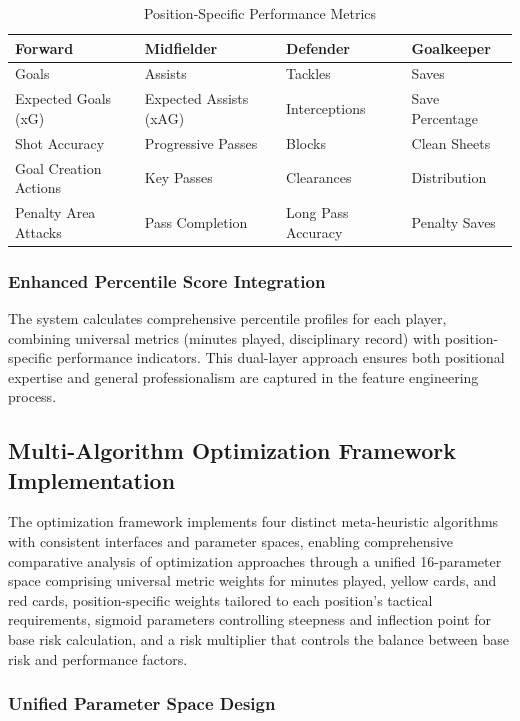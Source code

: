 \begin{table}[h]
\centering
\caption{Position-Specific Performance Metrics}
\label{tab:position_metrics}
\begin{tabular}{llll}
\toprule
\textbf{Forward} & \textbf{Midfielder} & \textbf{Defender} & \textbf{Goalkeeper} \\
\midrule
Goals & Assists & Tackles & Saves \\
Expected Goals (xG) & Expected Assists (xAG) & Interceptions & Save Percentage \\
Shot Accuracy & Progressive Passes & Blocks & Clean Sheets \\
Goal Creation Actions & Key Passes & Clearances & Distribution \\
Penalty Area Attacks & Pass Completion & Long Pass Accuracy & Penalty Saves \\
\bottomrule
\end{tabular}
\end{table}

\subsubsection{Enhanced Percentile Score Integration}

The system calculates comprehensive percentile profiles for each player, combining universal metrics (minutes played, disciplinary record) with position-specific performance indicators. This dual-layer approach ensures both positional expertise and general professionalism are captured in the feature engineering process.

\subsection{Multi-Algorithm Optimization Framework Implementation}

The optimization framework implements four distinct meta-heuristic algorithms with consistent interfaces and parameter spaces, enabling comprehensive comparative analysis of optimization approaches through a unified 16-parameter space comprising universal metric weights for minutes played, yellow cards, and red cards, position-specific weights tailored to each position's tactical requirements, sigmoid parameters controlling steepness and inflection point for base risk calculation, and a risk multiplier that controls the balance between base risk and performance factors.

\subsubsection{Unified Parameter Space Design}

